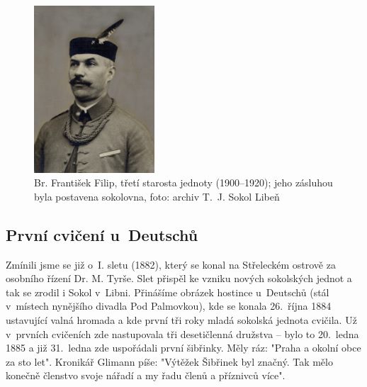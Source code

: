 \documentclass[a5paper, 11pt, twoside]{article}
\begin{document}
\begin{figure}[h!]
  \centering
   \includegraphics[width=0.4\textwidth]{img/07_filip_starosta.jpg}
  \caption*{Br. František Filip, třetí starosta jednoty (1900–⁠⁠⁠⁠⁠⁠1920); jeho zásluhou byla postavena sokolovna, foto: archiv T.~J. Sokol Libeň}
\end{figure}

\subsection{První cvičení u~Deutschů}
Zmínili jsme se již o~I. sletu (1882), který se konal na Střeleckém ostrově za osobního řízení Dr. M. Tyrše. Slet přispěl ke vzniku nových sokolských jednot a tak se zrodil i Sokol v~Libni. Přinášíme obrázek hostince u~Deutschů (stál v~místech nynějšího divadla Pod Palmovkou), kde se konala 26.~října 1884 ustavující valná hromada a kde první tři roky mladá sokolská jednota cvičila. Už v~prvních cvičeních zde nastupovala tři desetičlenná družstva – bylo to 20.~ledna 1885 a již 31.~ledna zde uspořádali první šibřinky. Měly ráz: "Praha a okolní obce za sto let". Kronikář Glimann píše: "Výtěžek Šibřinek byl značný. Tak mělo konečně členstvo svoje nářadí a my řadu členů a příznivců více".
\end{document}
